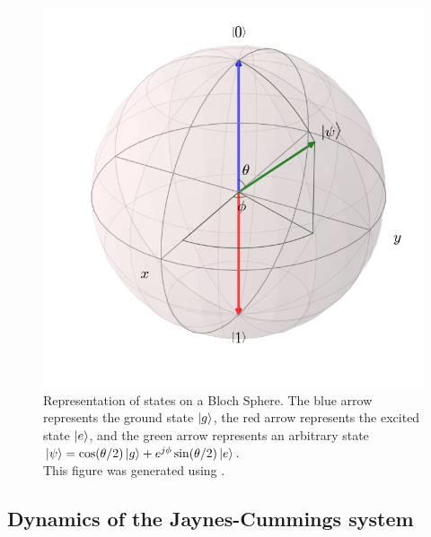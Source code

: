 \begin{figure}
\centering
\includegraphics[width=\linewidth]{Figures/bloch_rep.png}
\decoRule
\caption[Bloch Sphere Representation]{Representation of states on a Bloch Sphere. The blue arrow represents the ground state $\ket{g}$, the red arrow represents the excited state $\ket{e}$, and the green arrow represents an arbitrary state $\ket{\psi} = \cos(\theta/2)\ket{g}+e^{j\phi}\sin(\theta/2)\ket{e}$.\\This figure was generated using \cite{Johansson2012}.}
\label{fig:bloch rep}
\end{figure}

\subsection{Dynamics of the Jaynes-Cummings system}

